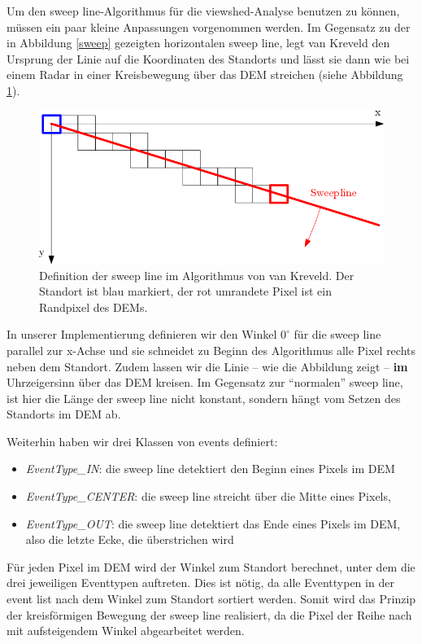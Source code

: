 Um den sweep line-Algorithmus für die viewshed-Analyse benutzen zu können, müssen ein paar kleine Anpassungen vorgenommen werden. Im Gegensatz zu 
der in Abbildung \ref{sweep} gezeigten horizontalen sweep line, legt van Kreveld den Ursprung der Linie auf die Koordinaten des Standorts und lässt 
sie dann wie bei einem Radar in einer Kreisbewegung über das DEM streichen (siehe Abbildung \ref{sweep_k}).

\begin{figure}[!ht]
 \centering
 \includegraphics[scale=0.45]{bilder/sweep_kreveld}
 \caption{Definition der sweep line im Algorithmus von van Kreveld. Der Standort ist blau markiert, der rot umrandete Pixel ist ein Randpixel des 
 DEMs.}
 \label{sweep_k}
\end{figure}

In unserer Implementierung definieren wir den Winkel $0^\circ$ für die sweep line parallel zur x-Achse und sie schneidet zu Beginn des Algorithmus 
alle Pixel rechts neben dem Standort. Zudem lassen wir die Linie -- wie die Abbildung zeigt -- \textbf{im} Uhrzeigersinn über das DEM kreisen. Im 
Gegensatz zur ``normalen'' sweep line, ist hier die Länge der sweep line nicht konstant, sondern hängt vom Setzen des Standorts im DEM ab. 

Weiterhin haben wir drei Klassen von events definiert: 
\begin{itemize}
 \item \textit{EventType\_IN}: die sweep line detektiert den Beginn eines Pixels im DEM 
 \item \textit{EventType\_CENTER}: die sweep line streicht über die Mitte eines Pixels,
 \item \textit{EventType\_OUT}: die sweep line detektiert das Ende eines Pixels im DEM, also die letzte Ecke, die überstrichen wird
\end{itemize}

Für jeden Pixel im DEM wird der Winkel zum Standort berechnet, unter dem die drei jeweiligen Eventtypen auftreten. Dies ist nötig, da alle Eventtypen 
in der event list nach dem Winkel zum Standort sortiert werden. Somit wird das Prinzip der kreisförmigen Bewegung der sweep line realisiert, da die 
Pixel der Reihe nach mit aufsteigendem Winkel abgearbeitet werden. 

